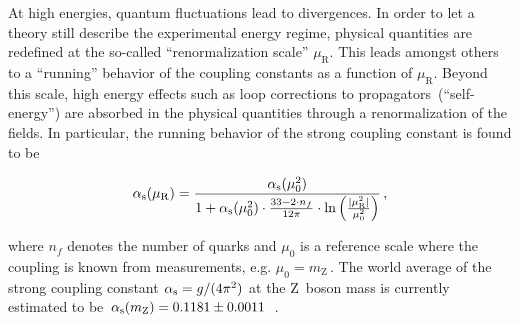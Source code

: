 
At high energies, quantum fluctuations lead to divergences. In order to let a theory still describe the experimental energy regime, physical quantities are redefined at the so-called ``renormalization scale'' $\mu_\mathrm{R}$. This leads amongst others to a ``running'' behavior of the coupling constants as a function of $\mu_\mathrm{R}$. Beyond this scale, high energy effects such as loop corrections to propagators~(``self-energy'') are absorbed in the physical quantities through a renormalization of the fields. In particular, the running behavior of the strong coupling constant is found to be 

\begin{equation}
{\alpha_\textrm{s}}(\mu_\mathrm{R})=\frac{{\alpha_\textrm{s}}(\mu_{0}^{2})}{1+{\alpha_\textrm{s}}(\mu_\mathrm{0}^2)\cdot\tfrac{33-2\cdot n_f}{12\pi}\cdot\ln\Big(\tfrac{|\mu_\mathrm{R}^2|}{\mu_{0}^{2}}\Big)}\,,
\end{equation}

where $n_f$ denotes the number of quarks and $\mu_{0}$ is a reference scale where the coupling is known from measurements, e.g. $\mu_{0}=m_\mathrm{Z}\,$. The world average of the strong coupling constant ${\alpha_\textrm{s}}=g/(4\pi^2)$ at the $\mathrm{Z}$~boson mass is currently estimated to be ${\alpha_\textrm{s}}(m_\mathrm{Z})=0.1181\pm0.0011$~\cite{Olive:2016xmw}. 

